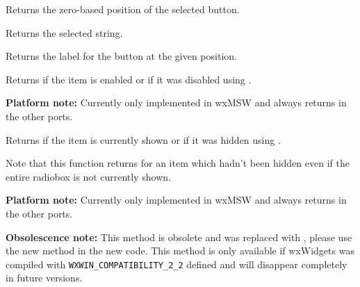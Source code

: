 \label{wxradioboxgetselection}


Returns the zero-based position of the selected button.


\label{wxradioboxgetstringselection}


Returns the selected string.


\label{wxradioboxgetstring}


Returns the label for the button at the given position.




\label{wxradioboxisitemenabled}


Returns \true if the item is enabled or \false if it was disabled using 
.

{\bf Platform note:} Currently only implemented in wxMSW and always returns
\true in the other ports.


\label{wxradioboxisitemshown}


Returns \true if the item is currently shown or \false if it was hidden using 
.

Note that this function returns \true for an item which hadn't been hidden even
if the entire radiobox is not currently shown.

{\bf Platform note:} Currently only implemented in wxMSW and always returns
\true in the other ports.


\label{wxradioboxnumber}


{\bf Obsolescence note:} This method is obsolete and was replaced with
, please use the new method in the new
code. This method is only available if wxWidgets was compiled with
{\tt WXWIN\_COMPATIBILITY\_2\_2} defined and will disappear completely in
future versions.

